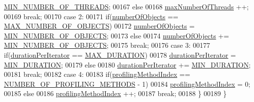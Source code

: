 \begin{DoxyCode}
      \hyperlink{main_8cpp_a7f46011598890ac8e7b3d6290df2e011}{MIN\_NUMBER\_OF\_THREADS};
00167                         \textcolor{keywordflow}{else}
00168                             \hyperlink{main_8cpp_a4639134a7fa7033334111ff9d77316f3}{maxNumberOfThreads} ++;
00169                         \textcolor{keywordflow}{break};
00170                     \textcolor{keywordflow}{case} 2:
00171                         \textcolor{keywordflow}{if}(\hyperlink{main_8cpp_a2303e0afaea24a80ed690de888548862}{numberOfObjects} == 
      \hyperlink{main_8cpp_aad62f3880f9d08f6213b65dc9373329e}{MAX\_NUMBER\_OF\_OBJECTS})
00172                             \hyperlink{main_8cpp_a2303e0afaea24a80ed690de888548862}{numberOfObjects} = 
      \hyperlink{main_8cpp_a33029f68c1cf4a3c7c90cfb59edee648}{MIN\_NUMBER\_OF\_OBJECTS};
00173                         \textcolor{keywordflow}{else}
00174                             \hyperlink{main_8cpp_a2303e0afaea24a80ed690de888548862}{numberOfObjects} += 
      \hyperlink{main_8cpp_a33029f68c1cf4a3c7c90cfb59edee648}{MIN\_NUMBER\_OF\_OBJECTS};
00175                         \textcolor{keywordflow}{break};
00176                     \textcolor{keywordflow}{case} 3:
00177                         \textcolor{keywordflow}{if}(\hyperlink{main_8cpp_a05d9b1ebdb968e99b310a90811f1be91}{durationPerIterator} == 
      \hyperlink{main_8cpp_a2564fde0b4c94421653b40a37597aa62}{MAX\_DURATION})
00178                             \hyperlink{main_8cpp_a05d9b1ebdb968e99b310a90811f1be91}{durationPerIterator} = 
      \hyperlink{main_8cpp_af00d30c4c9cd2a4bcd0cb0084bcabd30}{MIN\_DURATION};
00179                         \textcolor{keywordflow}{else}
00180                             \hyperlink{main_8cpp_a05d9b1ebdb968e99b310a90811f1be91}{durationPerIterator} += 
      \hyperlink{main_8cpp_af00d30c4c9cd2a4bcd0cb0084bcabd30}{MIN\_DURATION};
00181                         \textcolor{keywordflow}{break};
00182                     \textcolor{keywordflow}{case} 4:
00183                         \textcolor{keywordflow}{if}(\hyperlink{main_8cpp_a610d48030bfa1d44ea8b35346a1b4b21}{profilingMethodIndex} == 
      \hyperlink{main_8cpp_aca088c8a49d09566c6c129c95c3e82c9}{NUMBER\_OF\_PROFILING\_METHODS} - 1)
00184                             \hyperlink{main_8cpp_a610d48030bfa1d44ea8b35346a1b4b21}{profilingMethodIndex} = 0;
00185                         \textcolor{keywordflow}{else}
00186                             \hyperlink{main_8cpp_a610d48030bfa1d44ea8b35346a1b4b21}{profilingMethodIndex} ++;
00187                         \textcolor{keywordflow}{break};
00188                 \}
00189             \}

\end{DoxyCode}

